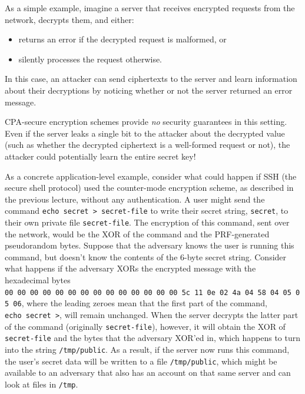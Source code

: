\documentclass[
  letterpaper,
]{scrbook}
\providecommand{\tightlist}{%
  \setlength{\itemsep}{0pt}\setlength{\parskip}{0pt}}
\theoremstyle{definition}
\theoremstyle{plain}
\theoremstyle{plain}
\theoremstyle{remark}
\begin{document}
As a simple example, imagine a server that receives encrypted requests
from the network, decrypts them, and either:

\begin{itemize}
\tightlist
\item
  returns an error if the decrypted request is malformed, or
\item
  silently processes the request otherwise.
\end{itemize}

In this case, an attacker can send ciphertexts to the server and learn
information about their decryptions by noticing whether or not the
server returned an error message.


CPA-secure encryption schemes provide \emph{no} security guarantees in
this setting. Even if the server leaks a single bit to the attacker
about the decrypted value (such as whether the decrypted ciphertext is a
well-formed request or not), the attacker could potentially learn the
entire secret key!

As a concrete application-level example, consider what could happen if
SSH (the secure shell protocol) used the counter-mode encryption scheme,
as described in the previous lecture, without any authentication. A user
might send the command
\texttt{echo\ secret\ \textgreater{}\ secret-file} to write their secret
string, \texttt{secret}, to their own private file \texttt{secret-file}.
The encryption of this command, sent over the network, would be the XOR
of the command and the PRF-generated pseudorandom bytes. Suppose that
the adversary knows the user is running this command, but doesn't know
the contents of the 6-byte secret string. Consider what happens if the
adversary XORs the encrypted message with the hexadecimal bytes
\texttt{00\ 00\ 00\ 00\ 00\ 00\ 00\ 00\ 00\ 00\ 00\ 00\ 00\ 00\ 5c\ 11\ 0e\ 02\ 4a\ 04\ 58\ 04\ 05\ 05\ 06},
where the leading zeroes mean that the first part of the command,
\texttt{echo\ secret\ \textgreater{}}, will remain unchanged. When the
server decrypts the latter part of the command (originally
\texttt{secret-file}), however, it will obtain the XOR of
\texttt{secret-file} and the bytes that the adversary XOR'ed in, which
happens to turn into the string \texttt{/tmp/public}. As a result, if
the server now runs this command, the user's secret data will be written
to a file \texttt{/tmp/public}, which might be available to an adversary
that also has an account on that same server and can look at files in
\texttt{/tmp}.
\end{document}
